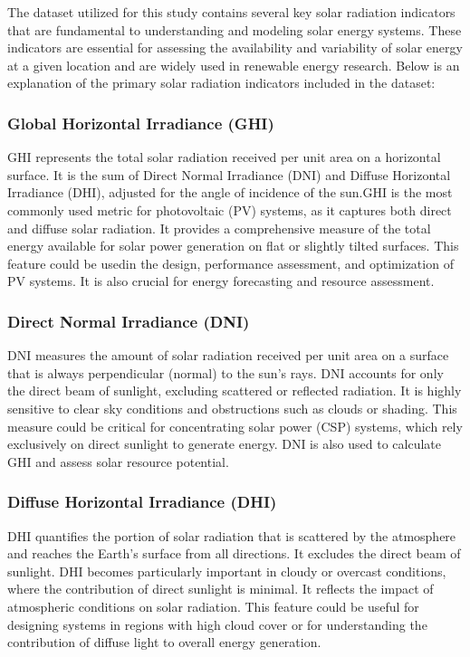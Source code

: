 \documentclass[10pt,twocolumn]{article}
\begin{document}
The dataset utilized for this study contains several key solar radiation indicators that are fundamental to understanding and modeling solar energy systems. These indicators are essential for assessing the availability and variability of solar energy at a given location and are widely used in renewable energy research. Below is an explanation of the primary solar radiation indicators included in the dataset:

\subsubsection{Global Horizontal Irradiance (GHI)}
\begin{itemize}
     GHI represents the total solar radiation received per unit area on a horizontal surface\cite{7}. It is the sum of Direct Normal Irradiance (DNI) and Diffuse Horizontal Irradiance (DHI), adjusted for the angle of incidence of the sun.GHI is the most commonly used metric for photovoltaic (PV) systems, as it captures both direct and diffuse solar radiation\cite{7}. It provides a comprehensive measure of the total energy available for solar power generation on flat or slightly tilted surfaces. This feature could be usedin the design, performance assessment, and optimization of PV systems. It is also crucial for energy forecasting and resource assessment.
\end{itemize}

\subsubsection{Direct Normal Irradiance (DNI)}
\begin{itemize}
     DNI measures the amount of solar radiation received per unit area on a surface that is always perpendicular (normal) to the sun's rays. DNI accounts for only the direct beam of sunlight, excluding scattered or reflected radiation. It is highly sensitive to clear sky conditions and obstructions such as clouds or shading. This measure could be critical for concentrating solar power (CSP) systems, which rely exclusively on direct sunlight to generate energy. DNI is also used to calculate GHI and assess solar resource potential.
\end{itemize}

\subsubsection{Diffuse Horizontal Irradiance (DHI)}
\begin{itemize}
    DHI quantifies the portion of solar radiation that is scattered by the atmosphere and reaches the Earth's surface from all directions. It excludes the direct beam of sunlight. DHI becomes particularly important in cloudy or overcast conditions, where the contribution of direct sunlight is minimal. It reflects the impact of atmospheric conditions on solar radiation. This feature could be useful for designing systems in regions with high cloud cover or for understanding the contribution of diffuse light to overall energy generation.
\end{itemize}
\end{document}

